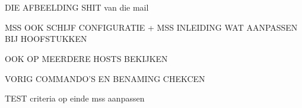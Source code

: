 \chapter{}
\label{ch:basisconf}

DIE AFBEELDING SHIT van die mail

MSS OOK SCHIJF CONFIGURATIE + MSS INLEIDING WAT AANPASSEN BIJ HOOFSTUKKEN

OOK OP MEERDERE HOSTS BEKIJKEN

VORIG COMMANDO'S EN BENAMING CHEKCEN

TEST criteria op einde mss aanpassen